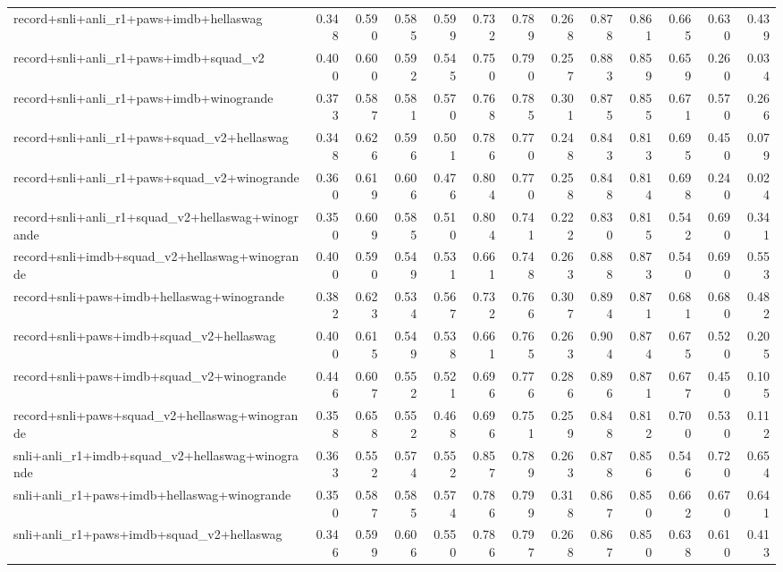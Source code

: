 \begin{table}[t]
\begin{tabular}{lrrrrrrrrrrrr}
    record+snli+anli\_r1+paws+imdb+hellaswag & 0.348 & 0.590 & 0.585 & 0.599 & 0.732 & 0.789 & 0.268 & 0.878 & 0.861 & 0.665 & 0.630 & 0.439 \\
    record+snli+anli\_r1+paws+imdb+squad\_v2 & 0.400 & 0.600 & 0.592 & 0.545 & 0.750 & 0.790 & 0.257 & 0.883 & 0.859 & 0.659 & 0.260 & 0.034 \\
    record+snli+anli\_r1+paws+imdb+winogrande & 0.373 & 0.587 & 0.581 & 0.570 & 0.768 & 0.785 & 0.301 & 0.875 & 0.855 & 0.671 & 0.570 & 0.266 \\
    record+snli+anli\_r1+paws+squad\_v2+hellaswag & 0.348 & 0.626 & 0.596 & 0.501 & 0.786 & 0.770 & 0.248 & 0.843 & 0.813 & 0.695 & 0.450 & 0.079 \\
    record+snli+anli\_r1+paws+squad\_v2+winogrande & 0.360 & 0.619 & 0.606 & 0.476 & 0.804 & 0.770 & 0.258 & 0.848 & 0.814 & 0.698 & 0.240 & 0.024 \\
    record+snli+anli\_r1+squad\_v2+hellaswag+winogrande & 0.350 & 0.609 & 0.585 & 0.510 & 0.804 & 0.741 & 0.222 & 0.830 & 0.815 & 0.542 & 0.690 & 0.341 \\
    record+snli+imdb+squad\_v2+hellaswag+winogrande & 0.400 & 0.590 & 0.549 & 0.531 & 0.661 & 0.748 & 0.263 & 0.888 & 0.873 & 0.540 & 0.690 & 0.553 \\
    record+snli+paws+imdb+hellaswag+winogrande & 0.382 & 0.623 & 0.534 & 0.567 & 0.732 & 0.766 & 0.307 & 0.894 & 0.871 & 0.681 & 0.680 & 0.482 \\
    record+snli+paws+imdb+squad\_v2+hellaswag & 0.400 & 0.615 & 0.549 & 0.538 & 0.661 & 0.765 & 0.263 & 0.904 & 0.874 & 0.675 & 0.520 & 0.205 \\
    record+snli+paws+imdb+squad\_v2+winogrande & 0.446 & 0.607 & 0.552 & 0.521 & 0.696 & 0.776 & 0.286 & 0.896 & 0.871 & 0.677 & 0.450 & 0.105 \\
    record+snli+paws+squad\_v2+hellaswag+winogrande & 0.358 & 0.658 & 0.552 & 0.468 & 0.696 & 0.751 & 0.259 & 0.848 & 0.812 & 0.700 & 0.530 & 0.112 \\
    snli+anli\_r1+imdb+squad\_v2+hellaswag+winogrande & 0.363 & 0.552 & 0.574 & 0.552 & 0.857 & 0.789 & 0.263 & 0.878 & 0.856 & 0.546 & 0.720 & 0.654 \\
    snli+anli\_r1+paws+imdb+hellaswag+winogrande & 0.350 & 0.587 & 0.585 & 0.574 & 0.786 & 0.799 & 0.318 & 0.867 & 0.850 & 0.662 & 0.670 & 0.641 \\
    snli+anli\_r1+paws+imdb+squad\_v2+hellaswag & 0.346 & 0.599 & 0.606 & 0.550 & 0.786 & 0.797 & 0.268 & 0.867 & 0.850 & 0.638 & 0.610 & 0.413 \\

\end{tabular}
\end{table}
